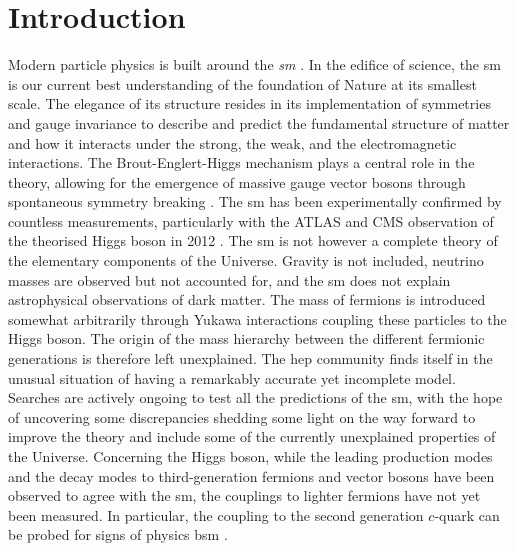 \chapter{\color{oxfordblue} Introduction}
\ChapFrame

Modern particle physics is built around the \textit{\gls{sm}} \cite{Schwartz_2013, SMphysics}. In the edifice of science, the \gls{sm} is our current best understanding of the foundation of Nature at its smallest scale. The elegance of its structure resides in its implementation of symmetries and gauge invariance to describe and predict the fundamental structure of matter and how it interacts under the strong, the weak, and the electromagnetic interactions. The Brout-Englert-Higgs mechanism plays a central role in the theory, allowing for the emergence of massive gauge vector bosons through spontaneous symmetry breaking \cite{Englert:1964et,  PhysRevLett.13.508}. The \gls{sm} has been experimentally confirmed by countless measurements, particularly with the ATLAS and CMS observation of the theorised Higgs boson in 2012 \cite{ATLAS:2012yve, CMS:2012qbp}. The \gls{sm} is not however a complete theory of the elementary components of the Universe. Gravity is not included, neutrino masses are observed but not accounted for, and the \gls{sm} does not explain astrophysical observations of dark matter. The mass of fermions is introduced somewhat arbitrarily through Yukawa interactions coupling these particles to the Higgs boson. The origin of the mass hierarchy between the different fermionic generations is therefore left unexplained. The \gls{hep} community finds itself in the unusual situation of having a remarkably accurate yet incomplete model. Searches are actively ongoing to test all the predictions of the \gls{sm}, with the hope of uncovering some discrepancies shedding some light on the way forward to improve the theory and include some of the currently unexplained properties of the Universe. Concerning the Higgs boson, while the leading production modes and the decay modes to third-generation fermions and vector bosons have been observed to agree with the \gls{sm}, the couplings to lighter fermions have not yet been measured. In particular, the coupling to the second generation $c$-quark can be probed for signs of physics \gls{bsm} \cite{PhysRevD.89.033014,PhysRevD.92.033016,Botella:2016krk,PhysRevD.98.055001,GHOSH2016504,PhysRevLett.123.031802,PhysRevD.100.115041}. \\

